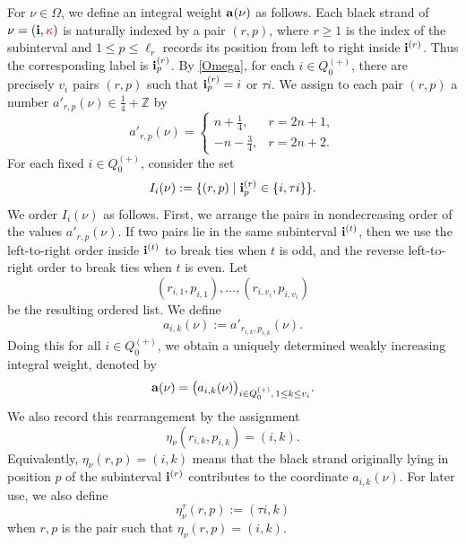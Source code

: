 For \(\nu\in\Omega\), we define an integral weight \(\mathbf{a}(\nu)\) as follows.
Each black strand of \(\nu=(\mathbf{i},{\color{red}\kappa})\) is naturally indexed by a pair
\((r,p)\), where \(r\geq 1\) is the index of the subinterval and
\(1\leq p\leq \ell_r\) records its position from left to right inside
\(\mathbf{i}^{(r)}\). Thus the corresponding label is \(\mathbf{i}^{(r)}_p\). By \cref{Omega}, for each \(i\in Q_0^{(+)}\), there are precisely \(v_i\)
pairs \((r,p)\) such that \({\mathbf{i}^{(r)}_p}=i\) or \(\tau i
\). We assign to each pair \((r,p)\) a number \(a'_{r,p}(\nu)\in \frac14+\mathbb Z\)
by
\[
   a'_{r,p}(\nu)=
   \begin{cases}
   n+\frac14, & r=2n+1,\\[2mm]
   -n-\frac34, & r=2n+2.
   \end{cases}
\]
For each fixed \(i\in Q_0^{(+)}\), consider the set
\[
   I_i(\nu):=\{(r,p)\mid \mathbf{i}^{(r)}_p\in\{i,\tau i\}\}.
\]
We order \(I_i(\nu)\) as follows. First, we arrange the pairs in nondecreasing
order of the values \(a'_{r,p}(\nu)\). If two pairs lie in the same subinterval
\(\mathbf{i}^{(t)}\), then we use the left-to-right order inside
\(\mathbf{i}^{(t)}\) to break ties when \(t\) is odd, and the reverse
left-to-right order to break ties when \(t\) is even. Let
\[
   (r_{i,1},p_{i,1}),\ldots,(r_{i,v_i},p_{i,v_i})
\]
be the resulting ordered list. We define
\[
   a_{i,k}(\nu):=a'_{r_{i,k},p_{i,k}}(\nu).
\]
Doing this for all \(i\in Q_0^{(+)}\), we obtain a uniquely determined weakly
increasing integral weight, denoted by
\[
   \mathbf{a}(\nu)=\bigl(a_{i,k}(\nu)\bigr)_{i\in Q_0^{(+)},\,1\leq k\leq v_i}.
\]
We also record this rearrangement by the assignment
\[
   \eta_\nu(r_{i,k},p_{i,k})=(i,k).
\]
Equivalently, \(\eta_\nu(r,p)=(i,k)\) means that the black strand originally
lying in position \(p\) of the subinterval \(\mathbf{i}^{(r)}\) contributes to the
coordinate \(a_{i,k}(\nu)\). For later use, we also define 
\[
\eta_\nu^\tau(r,p):=(\tau i,k)
\]
when \(r,p\) is the pair such that \(\eta_\nu(r,p)=(i,k)\).
